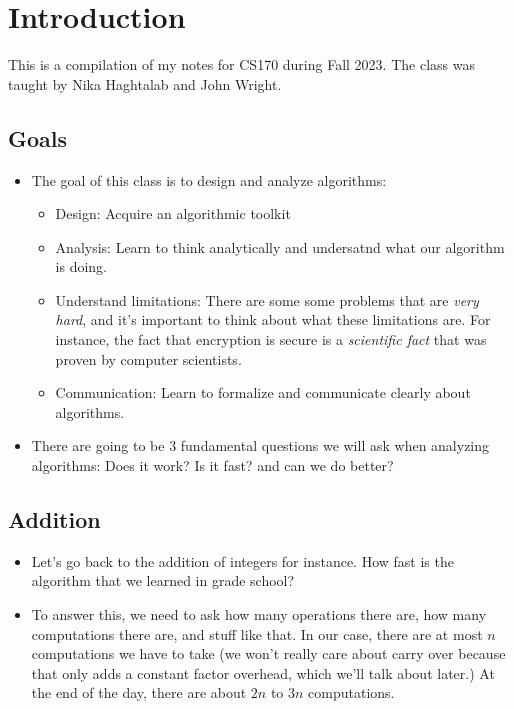 \section{Introduction}
This is a compilation of my notes for CS170 during Fall 2023. The class was taught by Nika Haghtalab and John Wright.  

\subsection{Goals}
\begin{itemize}
	\item The goal of this class is to design and analyze algorithms:
		\begin{itemize}
			\item Design: Acquire an algorithmic toolkit
			\item Analysis: Learn to think analytically and undersatnd what our algorithm is doing.
			\item Understand limitations: There are some some problems that are \textit{very hard}, and it's important to think about 
				what these limitations are. For instance, the fact that encryption is secure is a \textit{scientific fact}
				that was proven by computer scientists. 
			\item Communication: Learn to formalize and communicate clearly about algorithms.   
		\end{itemize}
	\item There are going to be 3 fundamental questions we will ask when analyzing algorithms: Does it work? Is it fast? 
		and can we do better?
\end{itemize}
\subsection{Addition}
\begin{itemize}
	\item Let's go back to the addition of integers for instance. How fast is the algorithm that we learned in 
		grade school? 
	\item To answer this, we need to ask how many operations there are, how many computations there are, and stuff like that. In 
		our case, there are at most \( n \) computations we have to take (we won't really care about carry over because that only 
		adds a constant factor overhead, which we'll talk about later.) At the end of the day, there are about 
		\( 2n \) to \( 3n \) computations. 
\end{itemize}
